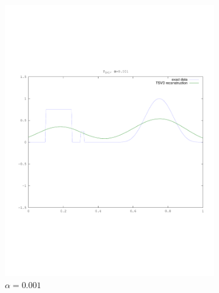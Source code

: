 \documentclass{article}
\begin{document}
\begin{figure}
\begin{subfigure}[b]{0.3\textwidth}
                \includegraphics[width=\textwidth]{plots/tsvd001.pdf}
                \caption{$\alpha=0.001$}
        \end{subfigure}
        \centering
        \begin{subfigure}[b]{0.3\textwidth}

\end{subfigure}
\end{figure}
\end{document}
